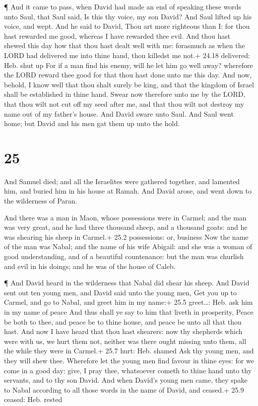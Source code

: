  ¶ And it came to pass, when David had made an end of
speaking these words unto Saul, that Saul said, Is this thy voice, my
son David? And Saul lifted up his voice, and wept.  And he
said to David, Thou art more righteous than I: for thou hast rewarded me
good, whereas I have rewarded thee evil.  And thou hast
shewed this day how that thou hast dealt well with me: forasmuch as when
the LORD had delivered me into thine hand, thou killedst me not.+ 24.18
delivered: Heb. shut up  For if a man find his enemy, will
he let him go well away? wherefore the LORD reward thee good for that
thou hast done unto me this day.  And now, behold, I know
well that thou shalt surely be king, and that the kingdom of Israel
shall be established in thine hand.  Swear now therefore
unto me by the LORD, that thou wilt not cut off my seed after me, and
that thou wilt not destroy my name out of my father's house.
 And David sware unto Saul. And Saul went home; but David
and his men gat them up unto the hold.

\hypertarget{section-24}{%
\section{25}\label{section-24}}

 And Samuel died; and all the Israelites were gathered
together, and lamented him, and buried him in his house at Ramah. And
David arose, and went down to the wilderness of Paran.

 And there was a man in Maon, whose possessions were in
Carmel; and the man was very great, and he had three thousand sheep, and
a thousand goats: and he was shearing his sheep in Carmel.+ 25.2
possessions: or, business  Now the name of the man was
Nabal; and the name of his wife Abigail: and she was a woman of good
understanding, and of a beautiful countenance: but the man was churlish
and evil in his doings; and he was of the house of Caleb.

 ¶ And David heard in the wilderness that Nabal did shear
his sheep.  And David sent out ten young men, and David said
unto the young men, Get you up to Carmel, and go to Nabal, and greet him
in my name:+ 25.5 greet\ldots: Heb. ask him in my name of peace
 And thus shall ye say to him that liveth in prosperity,
Peace be both to thee, and peace be to thine house, and peace be unto
all that thou hast.  And now I have heard that thou hast
shearers: now thy shepherds which were with us, we hurt them not,
neither was there ought missing unto them, all the while they were in
Carmel.+ 25.7 hurt: Heb. shamed  Ask thy young men, and they
will shew thee. Wherefore let the young men find favour in thine eyes:
for we come in a good day: give, I pray thee, whatsoever cometh to thine
hand unto thy servants, and to thy son David.  And when
David's young men came, they spake to Nabal according to all those words
in the name of David, and ceased.+ 25.9 ceased: Heb. rested

